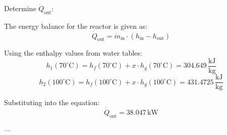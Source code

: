 Determine \( \dot{Q}_{\text{out}} \):  

The energy balance for the reactor is given as:  
\[
\dot{Q}_{\text{out}} = \dot{m}_{\text{in}} \cdot (h_{\text{in}} - h_{\text{out}})
\]  

Using the enthalpy values from water tables:  
\[
h_1(70^\circ\text{C}) = h_f(70^\circ\text{C}) + x \cdot h_g(70^\circ\text{C}) = 304.649 \, \frac{\text{kJ}}{\text{kg}}
\]  
\[
h_2(100^\circ\text{C}) = h_f(100^\circ\text{C}) + x \cdot h_g(100^\circ\text{C}) = 431.4725 \, \frac{\text{kJ}}{\text{kg}}
\]  

Substituting into the equation:  
\[
\dot{Q}_{\text{out}} = 38.047 \, \text{kW}
\]  

---